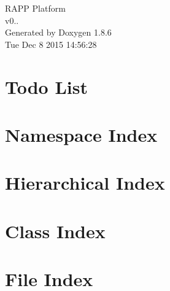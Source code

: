 \documentclass[twoside]{book}
\newcommand{\clearemptydoublepage}{%
  \newpage{\pagestyle{empty}\cleardoublepage}%
}
\begin{document}
\hypersetup{pageanchor=false}
\begin{titlepage}
\vspace*{7cm}
\begin{center}%
{\Large R\-A\-P\-P Platform \\[1ex]\large v0.. }\\
\vspace*{1cm}
{\large Generated by Doxygen 1.8.6}\\
\vspace*{0.5cm}
{\small Tue Dec 8 2015 14:56:28}\\
\end{center}
\end{titlepage}
\clearemptydoublepage
\tableofcontents
\clearemptydoublepage
{}
\hypersetup{pageanchor=true}

\chapter{Todo List}
\label{todo}
\hypertarget{todo}{}

\chapter{Namespace Index}

\chapter{Hierarchical Index}

\chapter{Class Index}

\chapter{File Index}

\end{document}
